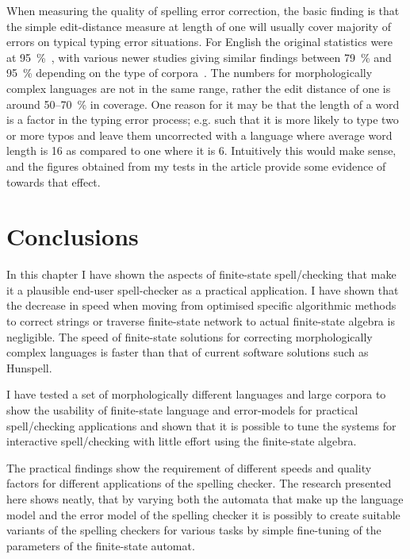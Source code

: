 \documentclass[officiallayout]{unihelcompling}
\begin{document}
When measuring the quality of spelling error correction, the basic finding is
that the simple edit-distance measure at length of one will usually cover
majority of errors on typical typing error situations. For English the original
statistics were at 95~\%~\citep{damerau1964technique}, with various newer
studies giving similar findings between 79~\% and 95~\% depending on the type
of corpora~\citep{kukich1992spelling}.  The numbers for morphologically complex
languages are not in the same range, rather the edit distance of one is around
50--70~\% in coverage. One reason for it may be that the length of a word is
a factor in the typing error process; e.g. such that it is more likely to type
two or more typos and leave them uncorrected with a language where average word
length is 16 as compared to one where it is 6. Intuitively this would make
sense, and the figures obtained from my tests in the article provide some
evidence of towards that effect.

\section{Conclusions}

In this chapter I have shown the aspects of finite-state spell\-/checking that
make it a plausible end-user spell-checker as a practical application. I have
shown that the decrease in speed when moving from optimised specific
algorithmic methods to correct strings or traverse finite-state network to
actual finite-state algebra is negligible. The speed of finite-state solutions
for correcting morphologically complex languages is faster than
that of current software solutions such as Hunspell.

I have tested a set of morphologically different languages and
large corpora to show the usability of finite-state language and error-models
for practical spell\-/checking applications and shown that it is possible to tune
the systems for interactive spell\-/checking with little effort using the
finite-state algebra.

The practical findings show the requirement of different speeds and quality
factors for different applications of the spelling checker. The research
presented here shows neatly, that by varying both the automata that make up
the language model and the error model of the spelling checker it is possibly
to create suitable variants of the spelling checkers for various tasks by
simple fine-tuning of the parameters of the finite-state automat.
\end{document}
